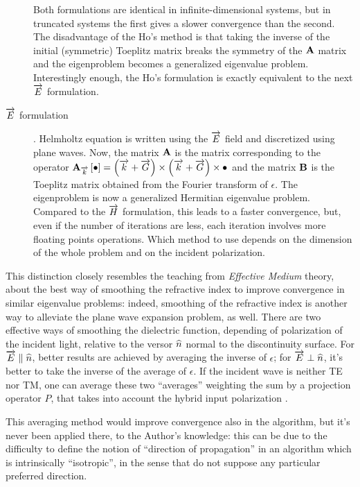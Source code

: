 \begin{description}
  Both formulations are identical in infinite-dimensional systems, but
  in truncated systems the first gives a slower convergence than the
  second. The disadvantage of the Ho's method is that taking the
  inverse of the initial (symmetric) Toeplitz matrix breaks the
  symmetry of the $\mathbf{A}$ matrix and the eigenproblem becomes a
  generalized eigenvalue problem. Interestingly enough, the Ho's
  formulation is exactly equivalent to the next $\overrightarrow{E}$ formulation.
\item[$\overrightarrow{E}$ formulation]. Helmholtz equation is written using the $\overrightarrow{E}$
  field and discretized using plane waves. Now, the matrix
  $\mathbf{A}$ is the matrix corresponding to the operator
  $\mathbf{A_{\overrightarrow{k}}}\left[\bullet\right] = {{\left( \overrightarrow{k} + \overrightarrow{G}
  \right) \times \left( \overrightarrow{k} + \overrightarrow{G} \right)} \times \bullet}$ and the matrix
  $\mathbf{B}$ is the Toeplitz matrix obtained from the Fourier
  transform of $\epsilon$. The eigenproblem is now a generalized
  Hermitian eigenvalue problem. Compared to the $\overrightarrow{H}$ formulation, this
  leads to a faster convergence, but, even if the number of iterations
  are less, each iteration involves more floating points
  operations. Which method to use depends on the dimension of the
  whole problem and on the incident polarization.
\end{description}

This distinction closely resembles the teaching from \emph{Effective
  Medium} theory, about the best way of smoothing the refractive index
to improve convergence in similar eigenvalue problems: indeed,
smoothing of the refractive index is another way to alleviate the
  plane wave expansion problem, as well. There are two effective ways of smoothing
the dielectric function, depending of polarization of the incident
light, relative to the versor $\widehat{n}$ normal to the discontinuity
surface. For $\overrightarrow{E} \parallel \widehat{n}$, better results are achieved by
  averaging the inverse of
$\epsilon$; for $\overrightarrow{E} \perp \widehat{n}$, it's better to take the inverse of the
average of $\epsilon$. If the incident wave is neither TE nor TM, one
can average these two ``averages'' weighting the sum by a projection
operator $P$, that takes into account the hybrid input polarization
  \cite{johnson_block}.

This averaging method would improve convergence also in the \FDTD
algorithm, but it's never been applied there, to the Author's
knowledge: this can be due to the difficulty to define the notion of
``direction of propagation'' in an algorithm which is intrinsically
``isotropic'', in the sense that do not suppose any particular
preferred direction.

